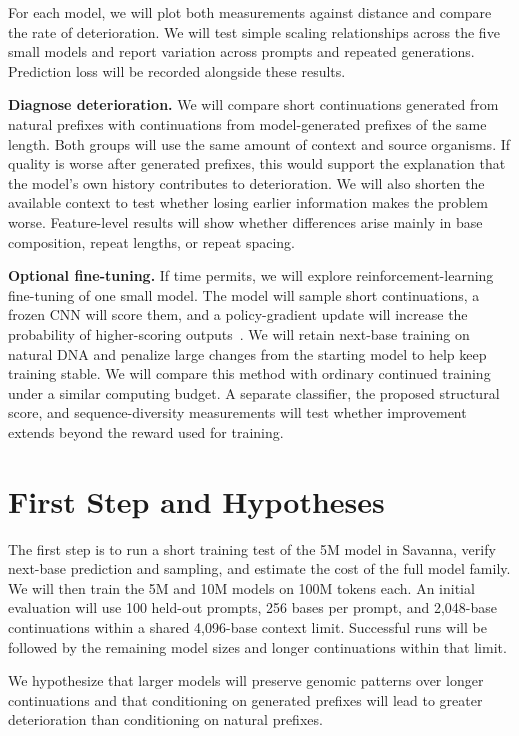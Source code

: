 \documentclass[11pt,letterpaper]{article}
\begin{document}
For each model, we will plot both measurements against distance and compare the rate of deterioration. We will test simple scaling relationships across the five small models and report variation across prompts and repeated generations. Prediction loss will be recorded alongside these results.

\textbf{Diagnose deterioration.} We will compare short continuations generated from natural prefixes with continuations from model-generated prefixes of the same length. Both groups will use the same amount of context and source organisms. If quality is worse after generated prefixes, this would support the explanation that the model's own history contributes to deterioration. We will also shorten the available context to test whether losing earlier information makes the problem worse. Feature-level results will show whether differences arise mainly in base composition, repeat lengths, or repeat spacing.

\textbf{Optional fine-tuning.} If time permits, we will explore reinforcement-learning fine-tuning of one small model. The model will sample short continuations, a frozen CNN will score them, and a policy-gradient update will increase the probability of higher-scoring outputs~\cite{seqgan}. We will retain next-base training on natural DNA and penalize large changes from the starting model to help keep training stable. We will compare this method with ordinary continued training under a similar computing budget. A separate classifier, the proposed structural score, and sequence-diversity measurements will test whether improvement extends beyond the reward used for training.

\section{First Step and Hypotheses}
The first step is to run a short training test of the 5M model in Savanna, verify next-base prediction and sampling, and estimate the cost of the full model family. We will then train the 5M and 10M models on 100M tokens each. An initial evaluation will use 100 held-out prompts, 256 bases per prompt, and 2,048-base continuations within a shared 4,096-base context limit. Successful runs will be followed by the remaining model sizes and longer continuations within that limit.

We hypothesize that larger models will preserve genomic patterns over longer continuations and that conditioning on generated prefixes will lead to greater deterioration than conditioning on natural prefixes.
\end{document}
